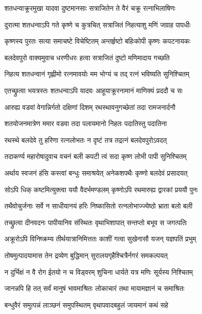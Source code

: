 \begin{center}
\twolineshloka
{शतधन्वाक्रूरमुखा यादवा दुष्टमानसाः}
{सत्राजितेन ते वैरं चक्रू रत्नाभिलाषिणः}%

\twolineshloka
{दुरात्मा शतधन्वाऽपि गते कृष्णे च कुत्रचित्}
{सत्राजितं निहत्याशु मणिं जग्राह पापधीः}%

\twolineshloka
{कृष्णस्य पुरतः सत्या समाचष्टे विचेष्टितम्}
{अन्तर्हृष्टो बहिःकोपी कृष्णः कपटनायकः}%

\twolineshloka
{बलदेवपुरो वाक्यमुवाच धरणीधरः}
{हत्वा सत्राजितं दुष्टो मणिमादाय गच्छति}%

\twolineshloka
{निहत्य शतधन्वानं गृह्णीमो रत्नमावयोः}
{मम भोग्यं च तद् रत्नं भविष्यति सुनिश्चितम्}%

\twolineshloka
{एतच्छ्रुत्वा  भयत्रस्तः शतधन्वाऽपि यादवः}
{आहूयाक्रूरनामानं माणिक्यं प्रददौ च सः}%

\twolineshloka
{आरुह्य वडवां वेगान्निर्गतो दक्षिणां दिशम्}
{रथस्थावनुगच्छेतां तदा रामजनार्दनौ}%

\twolineshloka
{शतयोजनमात्रेण ममार वडवा तदा}
{पलायमानो निहतः पदातिस्तु पदातिना}%

\twolineshloka
{रथस्थे बलदेवे तु हरिणा रत्नलोभतः}
{न दृष्टं तत्र तद्रत्नं बलदेवपुरोऽवदत्}%

\twolineshloka
{तदाकर्ण्य महारोषादुवाच वचनं बली}
{कपटी त्वं सदा कृष्ण लोभी पापी सुनिश्चितम्}%

\twolineshloka
{अर्थाय स्वजनं हंसि कस्त्वां बन्धुः समाश्रयेत्}
{अनेकशपथैः कृष्णो बलदेवं प्रसादयत्}%

\twolineshloka
{सोऽपि धिक् कष्टमित्युक्त्वा ययौ वैदर्भमण्डलम्}
{कृष्णोऽपि रथमारुह्य द्वारकां प्रययौ पुनः}%

\twolineshloka
{तथैवोचुर्जनाः सर्वे न साधीयानयं हरिः}
{निष्कासितो रत्नलोभाज्ज्येष्ठो भ्राता बलो बली}%

\twolineshloka
{तच्छ्रुत्वा दीनवदनः पापीयानिव संस्थितः}
{वृथाभिशापात् सन्तप्तो बभूव स जगत्पतिः}%

\twolineshloka
{अक्रूरोऽपि विनिष्क्रम्य तीर्थयात्रानिमित्ततः}
{काशीं गत्वा सुखेनासौ यजन् यज्ञपतिं प्रभुम्}%

\twolineshloka
{तोषमुत्पादयामास तेन द्रव्येण बुद्धिमान्}
{सुरालयगृहैश्चित्रैर्नगरं समकल्पयत्}%

\twolineshloka
{न दुर्भिक्षं न वै रोग ईतयो न च विड्वरम्}
{शुचिना धार्यते यत्र मणिः सूर्यस्य निश्चितम्}%

\twolineshloka
{जानन्नपि हि तत् सर्वं मानुषं भावमाश्रितः}
{लोकाचारं तथा मायामज्ञानं च समाश्रितः}%

\twolineshloka
{बन्धुवैरं समुत्पन्नं लाञ्छनं समुपस्थितम्}
{वृथापवादबहुलं जायमानं कथं सहे}%


\end{center}
